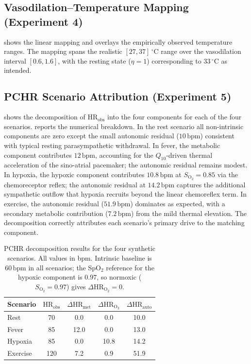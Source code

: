 \documentclass[10pt,twocolumn,a4paper]{article}
\theoremstyle{definition}
\newcommand{\HRobs}{\mathrm{HR}_{\mathrm{obs}}}
\newcommand{\dHRm}{\Delta\mathrm{HR}_{\mathrm{met}}}
\newcommand{\dHRo}{\Delta\mathrm{HR}_{\mathrm{O_2}}}
\newcommand{\dHRa}{\Delta\mathrm{HR}_{\mathrm{auto}}}
\newcommand{\Qten}{Q_{10}}
\newcommand{\vaso}{\eta}
\newcommand{\Soxy}{S_{\mathrm{O_2}}}
\begin{document}
\subsection{Vasodilation--Temperature Mapping (Experiment 4)}

 shows the linear mapping and overlays the
empirically observed temperature ranges. The mapping spans the
realistic $[27, 37]\,^{\circ}\mathrm{C}$ range over the
vasodilation interval $[0.6, 1.6]$, with the resting state
($\vaso=1$) corresponding to $33\,^{\circ}\mathrm{C}$ as
intended.



\subsection{PCHR Scenario Attribution (Experiment 5)}

 shows the decomposition of $\HRobs$ into
the four components for each of the four scenarios.
 reports the numerical breakdown. In the
rest scenario all non-intrinsic components are zero except the
small autonomic residual ($10\,\mathrm{bpm}$) consistent with
typical resting parasympathetic withdrawal. In fever, the metabolic
component contributes $12\,\mathrm{bpm}$, accounting for the
$\Qten$-driven thermal acceleration of the sino-atrial pacemaker;
the autonomic residual remains modest. In hypoxia, the hypoxic
component contributes $10.8\,\mathrm{bpm}$ at $\Soxy=0.85$ via the
chemoreceptor reflex; the autonomic residual at $14.2\,\mathrm{bpm}$
captures the additional sympathetic outflow that hypoxia recruits
beyond the linear chemoreflex term. In exercise, the autonomic
residual ($51.9\,\mathrm{bpm}$) dominates as expected, with a
secondary metabolic contribution ($7.2\,\mathrm{bpm}$) from the mild
thermal elevation. The decomposition correctly attributes each
scenario's primary drive to the matching component.



\begin{table}[H]
\centering
\caption{PCHR decomposition results for the four synthetic
scenarios. All values in bpm. Intrinsic baseline is $60\,\mathrm{bpm}$
in all scenarios; the SpO$_{2}$ reference for the hypoxic
component is $0.97$, so normoxic ($\Soxy=0.97$) gives
$\dHRo=0$.}
\label{tab:pchr-scenarios}
\small
\begin{tabular}{lcccc}
\toprule
Scenario & $\HRobs$ & $\dHRm$ & $\dHRo$ & $\dHRa$ \\
\midrule
Rest     & 70  &  0.0 &  0.0 & 10.0 \\
Fever    & 85  & 12.0 &  0.0 & 13.0 \\
Hypoxia  & 85  &  0.0 & 10.8 & 14.2 \\
Exercise & 120 &  7.2 &  0.9 & 51.9 \\
\bottomrule
\end{tabular}
\end{table}
\end{document}
